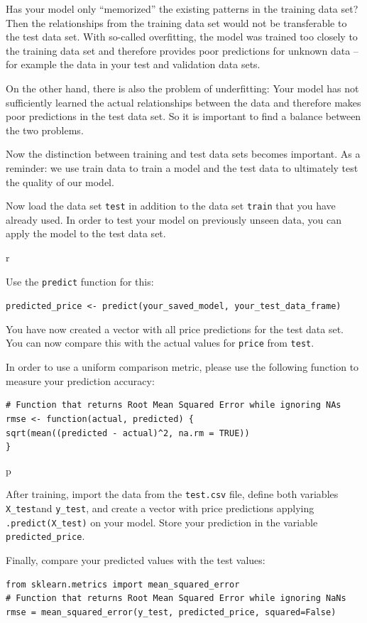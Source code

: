 \documentclass[
  11pt,
]{book}
\begin{document}
Has your model only ``memorized'' the existing patterns in the training
data set? Then the relationships from the training data set would not be
transferable to the test data set. With so-called overfitting, the model
was trained too closely to the training data set and therefore provides
poor predictions for unknown data -- for example the data in your test
and validation data sets.

On the other hand, there is also the problem of underfitting: Your model
has not sufficiently learned the actual relationships between the data
and therefore makes poor predictions in the test data set. So it is
important to find a balance between the two problems.

Now the distinction between training and test data sets becomes
important. As a reminder: we use train data to train a model and the
test data to ultimately test the quality of our model.

Now load the data set \texttt{test} in addition to the data set
\texttt{train} that you have already used. In order to test your model
on previously unseen data, you can apply the model to the test data set.

\begin{tips}r

Use the \texttt{predict} function for this:

\texttt{predicted\_price\ \textless{}-\ predict(your\_saved\_model,\ your\_test\_data\_frame)}

You have now created a vector with all price predictions for the test
data set. You can now compare this with the actual values for
\texttt{price} from \texttt{test}.

In order to use a uniform comparison metric, please use the following
function to measure your prediction accuracy:

\begin{verbatim}
# Function that returns Root Mean Squared Error while ignoring NAs
rmse <- function(actual, predicted) {
sqrt(mean((predicted - actual)^2, na.rm = TRUE))
}
\end{verbatim}

\end{tips}

\begin{tipsp}p

After training, import the data from the \texttt{test.csv} file, define
both variables \texttt{X\_test}and \texttt{y\_test}, and create a vector
with price predictions applying \texttt{.predict(X\_test)} on your
model. Store your prediction in the variable \texttt{predicted\_price}.

Finally, compare your predicted values with the test values:

\begin{verbatim}
from sklearn.metrics import mean_squared_error
# Function that returns Root Mean Squared Error while ignoring NaNs
rmse = mean_squared_error(y_test, predicted_price, squared=False)
\end{verbatim}

\end{tipsp}
\end{document}
